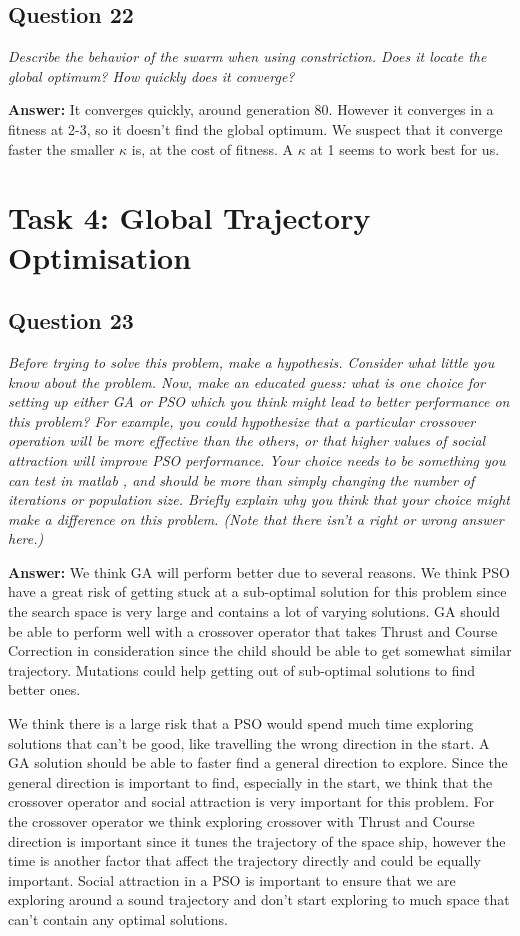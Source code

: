 \documentclass[a4paper]{article}
\begin{document}
\subsection*{Question 22}
\emph{Describe the behavior of the swarm when using constriction.
Does it locate the global optimum? How quickly does it converge?}

\textbf{Answer:} It converges quickly, around generation 80. However it converges in a fitness at 2-3, so it doesn't find the global optimum. We suspect that it converge faster the smaller $\kappa$ is, at the cost of fitness. A $\kappa$ at 1 seems to work best for us. 

\section*{Task 4: Global Trajectory Optimisation}

\subsection*{Question 23}
\emph{Before trying to solve this problem, make a hypothesis. Consider what little you know about the problem. Now, make an educated guess: what is one choice for setting up either GA or PSO which you think might lead to better performance on this problem? For example, you could hypothesize that a particular crossover operation will be more effective than the others, or that higher values of social attraction will improve PSO performance. Your choice needs to be something you can test in matlab , and should be more than simply changing the number of iterations or population size. Briefly explain why you
think that your choice might make a difference on this problem. (Note that there isn’t a right or wrong answer here.)}

\textbf{Answer:} We think GA will perform better due to several reasons. We think PSO have a great risk of getting stuck at a sub-optimal solution for this problem since the search space is very large and contains a lot of varying solutions. GA should be able to perform well with a crossover operator that takes Thrust and Course Correction in consideration since the child should be able to get somewhat similar trajectory. Mutations could help getting out of sub-optimal solutions to find better ones.

We think there is a large risk that a PSO would spend much time exploring solutions that can't be good, like travelling the wrong direction in the start. A GA solution should be able to faster find a general direction to explore. 
Since the general direction is important to find, especially in the start, we think that the crossover operator and social attraction is very important for this problem. For the crossover operator we think exploring crossover with Thrust and Course direction is important since it tunes the trajectory of the space ship, however the time is another factor that affect the trajectory directly and could be equally important.
Social attraction in a PSO is important to ensure that we are exploring around a sound trajectory and don't start exploring to much space that can't contain any optimal solutions. 
\end{document}
